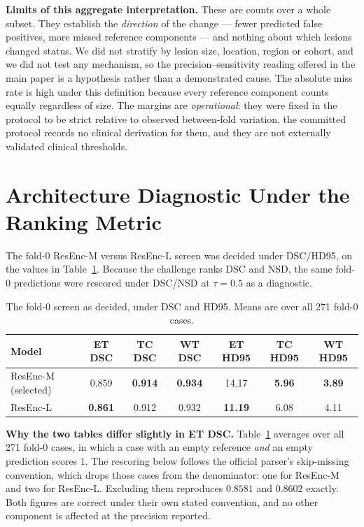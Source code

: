 \documentclass[runningheads]{llncs}
\begin{document}
\medskip\noindent\textbf{Limits of this aggregate interpretation.} These are counts over a whole
subset. They establish the \emph{direction} of the change --- fewer predicted false positives, more
missed reference components --- and nothing about which lesions changed status. We did not stratify
by lesion size, location, region or cohort, and we did not test any mechanism, so the
precision--sensitivity reading offered in the main paper is a hypothesis rather than a demonstrated
cause. The absolute miss rate is high under this definition because every reference component counts
equally regardless of size. The margins are \emph{operational}: they were fixed in the protocol to be
strict relative to observed between-fold variation, the committed protocol records no clinical
derivation for them, and they are not externally validated clinical thresholds.


\section{Architecture Diagnostic Under the Ranking Metric}

The fold-0 ResEnc-M versus ResEnc-L screen was decided under DSC/HD95, on the values in
Table~\ref{tab:screen}. Because the challenge ranks DSC and NSD, the same fold-0 predictions were
rescored under DSC/NSD at $\tau=0.5$ as a diagnostic.

\begin{table}[htbp]\centering
\caption{The fold-0 screen as decided, under DSC and HD95. Means are over all 271 fold-0 cases.}
\label{tab:screen}
\begin{tabular}{@{}lcccccc@{}}
\toprule
Model & ET DSC & TC DSC & WT DSC & ET HD95 & TC HD95 & WT HD95 \\
\midrule
ResEnc-M (selected) & 0.859 & \textbf{0.914} & \textbf{0.934} & 14.17 & \textbf{5.96} & \textbf{3.89} \\
ResEnc-L            & \textbf{0.861} & 0.912 & 0.932 & \textbf{11.19} & 6.08 & 4.11 \\
\bottomrule
\end{tabular}
\end{table}

\medskip\noindent\textbf{Why the two tables differ slightly in ET DSC.} Table~\ref{tab:screen}
averages over all 271 fold-0 cases, in which a case with an empty reference \emph{and} an empty
prediction scores $1$. The rescoring below follows the official parser's skip-missing convention,
which drops those cases from the denominator: one for ResEnc-M and two for ResEnc-L. Excluding them
reproduces $0.8581$ and $0.8602$ exactly. Both figures are correct under their own stated
convention, and no other component is affected at the precision reported.
\end{document}
